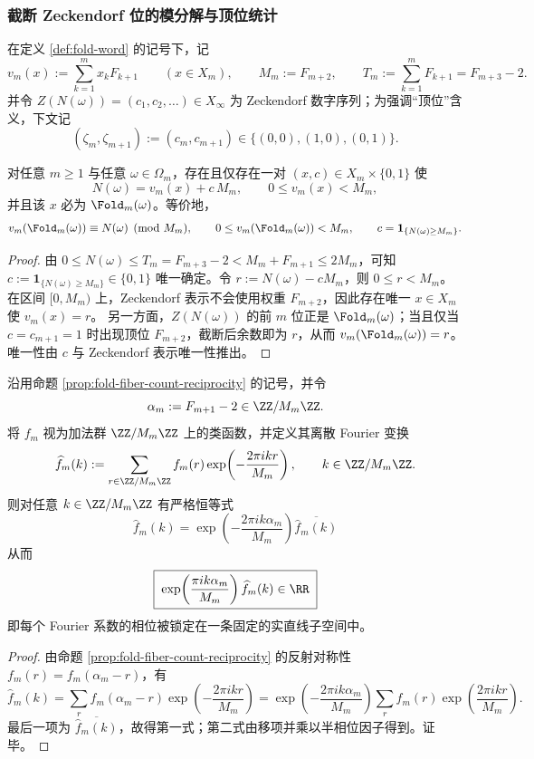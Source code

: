 \subsubsection{截断 Zeckendorf 位的模分解与顶位统计}\label{subsubsec:fold-zeckendorf-mod-topbits}

在定义 \ref{def:fold-word} 的记号下，记
\[
v_m(x):=\sum_{k=1}^{m}x_kF_{k+1}\qquad(x\in X_m),
\qquad
M_m:=F_{m+2},
\qquad
T_m:=\sum_{k=1}^{m}F_{k+1}=F_{m+3}-2.
\]
并令 $Z(N(\omega))=(c_1,c_2,\dots)\in X_\infty$ 为 Zeckendorf 数字序列；为强调“顶位”含义，下文记
\[
(\zeta_m,\zeta_{m+1}):=(c_m,c_{m+1})\in\{(0,0),(1,0),(0,1)\}.
\]

\begin{theorem}[截断位的模分解与唯一性]\label{thm:fold-zeckendorf-mod-decomposition-unique}
对任意 $m\ge 1$ 与任意 $\omega\in\Omega_m$，存在且仅存在一对 $(x,c)\in X_m\times\{0,1\}$ 使
\[
N(\omega)=v_m(x)+c\,M_m,
\qquad 0\le v_m(x)<M_m,
\]
并且该 $x$ 必为 $\Fold_m(\omega)$。等价地，
\[
v_m(\Fold_m(\omega))\equiv N(\omega)\pmod{M_m},
\qquad
0\le v_m(\Fold_m(\omega))<M_m,
\qquad
c=\mathbf 1_{\{N(\omega)\ge M_m\}}.
\]
\end{theorem}

\begin{proof}
由 $0\le N(\omega)\le T_m=F_{m+3}-2<M_m+F_{m+1}\le 2M_m$，可知
$c:=\mathbf 1_{\{N(\omega)\ge M_m\}}\in\{0,1\}$ 唯一确定。令 $r:=N(\omega)-cM_m$，则 $0\le r<M_m$。
在区间 $[0,M_m)$ 上，Zeckendorf 表示不会使用权重 $F_{m+2}$，因此存在唯一 $x\in X_m$ 使 $v_m(x)=r$。
另一方面，$Z(N(\omega))$ 的前 $m$ 位正是 $\Fold_m(\omega)$；当且仅当 $c=c_{m+1}=1$ 时出现顶位 $F_{m+2}$，截断后余数即为 $r$，从而 $v_m(\Fold_m(\omega))=r$。唯一性由 $c$ 与 Zeckendorf 表示唯一性推出。
\end{proof}

\begin{proposition}\label{prop:fold-fiber-fourier-phase-rigidity}
沿用命题 \ref{prop:fold-fiber-count-reciprocity} 的记号，并令
\[
\alpha_m:=F_{m+1}-2\in\ZZ/M_m\ZZ.
\]
将 \(f_m\) 视为加法群 \(\ZZ/M_m\ZZ\) 上的类函数，并定义其离散 Fourier 变换
\[
\widehat f_m(k):=\sum_{r\in\ZZ/M_m\ZZ} f_m(r)\exp\!\left(-\frac{2\pi i kr}{M_m}\right),
\qquad k\in\ZZ/M_m\ZZ.
\]
则对任意 \(k\in\ZZ/M_m\ZZ\) 有严格恒等式
\[
\boxed{\;
\widehat f_m(k)
=\exp\!\left(-\frac{2\pi i k\alpha_m}{M_m}\right)\overline{\widehat f_m(k)}\;}
\]
从而
\[
\boxed{\;
\exp\!\left(\frac{\pi i k\alpha_m}{M_m}\right)\widehat f_m(k)\in\RR\;}
\]
即每个 Fourier 系数的相位被锁定在一条固定的实直线子空间中。
\end{proposition}
\begin{proof}
由命题 \ref{prop:fold-fiber-count-reciprocity} 的反射对称性 \(f_m(r)=f_m(\alpha_m-r)\)，有
\[
\widehat f_m(k)
=\sum_{r} f_m(\alpha_m-r)\exp\!\left(-\frac{2\pi i kr}{M_m}\right)
=\exp\!\left(-\frac{2\pi i k\alpha_m}{M_m}\right)\sum_{r} f_m(r)\exp\!\left(\frac{2\pi i kr}{M_m}\right).
\]
最后一项为 \(\overline{\widehat f_m(k)}\)，故得第一式；第二式由移项并乘以半相位因子得到。证毕。
\end{proof}

